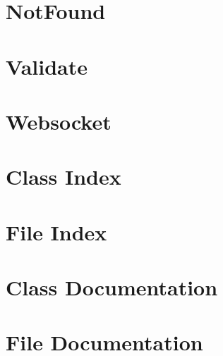 \documentclass[twoside]{book}
\newcommand{\+}{\discretionary{\mbox{\scriptsize$\hookleftarrow$}}{}{}}
\newcommand{\clearemptydoublepage}{%
    \newpage{\pagestyle{empty}\cleardoublepage}%
  }
\begin{document}
\chapter{Not\+Found}
\label{md_src_routes_NotFound}

\chapter{Validate}
\label{md_src_routes_Validate}

\chapter{Websocket}
\label{md_src_routes_Websocket}

\chapter{Class Index}

\chapter{File Index}

\chapter{Class Documentation}


\chapter{File Documentation}


































  \backmatter
  \newpage
  \clearemptydoublepage
  \printindex
\end{document}
